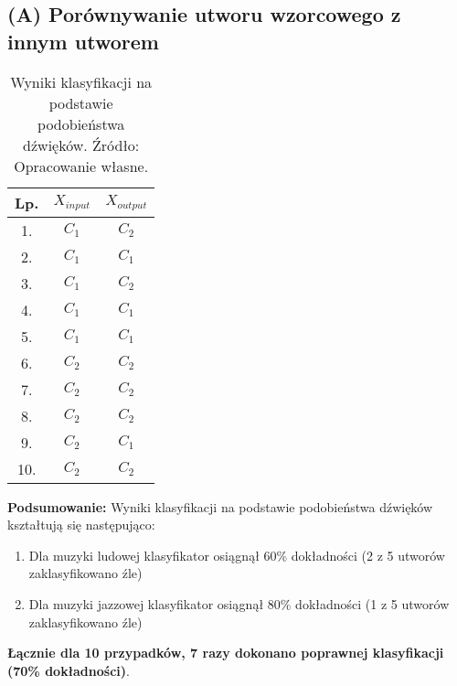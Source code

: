 \subsection{(A) Porównywanie utworu wzorcowego z innym utworem}
\begin{table}
\begin{tabular}{|c|c|c|}
\hline
Lp. & $X_{input}$ & $X_{output}$ \\ \hline
1.   & $C_{1}$      & $C_{2}$      \\ \hline
2.   & $C_{1}$      & $C_{1}$     \\ \hline
3.   & $C_{1}$      & $C_{2}$      \\ \hline
4.   & $C_{1}$      & $C_{1}$     \\ \hline
5.   & $C_{1}$      & $C_{1}$      \\ \hline
6.   & $C_{2}$      & $C_{2}$    \\ \hline
7.   & $C_{2}$      & $C_{2}$     \\ \hline
8.   & $C_{2}$      & $C_{2}$     \\ \hline
9.   & $C_{2}$      & $C_{1}$     \\ \hline
10.  & $C_{2}$      & $C_{2}$      \\ \hline
\end{tabular}
\centering
\caption{Wyniki klasyfikacji na podstawie podobieństwa dźwięków. Źródło: Opracowanie własne.}
\label{tabela 1}
\end{table}

\textbf{Podsumowanie:}
Wyniki klasyfikacji na podstawie podobieństwa dźwięków kształtują się następująco:

\begin{enumerate}
    \item Dla muzyki ludowej klasyfikator osiągnął 60\% dokładności (2 z 5 utworów zaklasyfikowano źle)
    \item Dla muzyki jazzowej klasyfikator osiągnął 80\% dokładności (1 z 5 utworów zaklasyfikowano źle)
\end{enumerate}

\textbf{Łącznie dla 10 przypadków, 7 razy dokonano poprawnej klasyfikacji (70\% dokładności)}.


